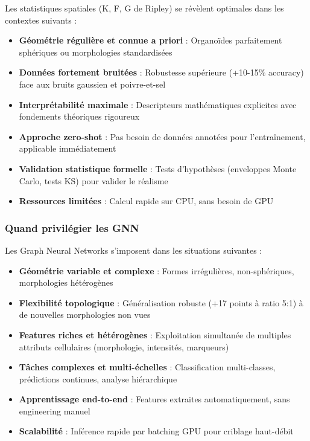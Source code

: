 Les statistiques spatiales (K, F, G de Ripley) se révèlent optimales dans les contextes suivants :

\begin{itemize}
    \item \textbf{Géométrie régulière et connue a priori} : Organoïdes parfaitement sphériques ou morphologies standardisées
    \item \textbf{Données fortement bruitées} : Robustesse supérieure (+10-15\% accuracy) face aux bruits gaussien et poivre-et-sel
    \item \textbf{Interprétabilité maximale} : Descripteurs mathématiques explicites avec fondements théoriques rigoureux
    \item \textbf{Approche zero-shot} : Pas besoin de données annotées pour l'entraînement, applicable immédiatement
    \item \textbf{Validation statistique formelle} : Tests d'hypothèses (enveloppes Monte Carlo, tests KS) pour valider le réalisme
    \item \textbf{Ressources limitées} : Calcul rapide sur CPU, sans besoin de GPU
\end{itemize}

\subsubsection{Quand privilégier les GNN}

Les Graph Neural Networks s'imposent dans les situations suivantes :

\begin{itemize}
    \item \textbf{Géométrie variable et complexe} : Formes irrégulières, non-sphériques, morphologies hétérogènes
    \item \textbf{Flexibilité topologique} : Généralisation robuste (+17 points à ratio 5:1) à de nouvelles morphologies non vues
    \item \textbf{Features riches et hétérogènes} : Exploitation simultanée de multiples attributs cellulaires (morphologie, intensités, marqueurs)
    \item \textbf{Tâches complexes et multi-échelles} : Classification multi-classes, prédictions continues, analyse hiérarchique
    \item \textbf{Apprentissage end-to-end} : Features extraites automatiquement, sans engineering manuel
    \item \textbf{Scalabilité} : Inférence rapide par batching GPU pour criblage haut-débit
\end{itemize}

